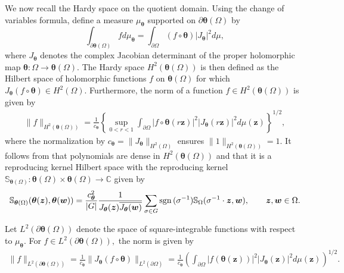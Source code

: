 \documentclass[12pt,reqno]{amsart}
\theoremstyle{remark}
\theoremstyle{definition}
\newcommand{\beq}{\begin{eqnarray}}
\newcommand{\eeq}{\end{eqnarray}}
\newcommand{\sgn}{{\rm sgn\,}}
\def \z{\boldsymbol{z}}
\begin{document}
We now recall the Hardy space on the quotient domain. Using the change of variables formula, define a measure $\mu_{\boldsymbol\theta}$ supported on $\partial \boldsymbol \theta(\Omega) $ by
$$\int_{\partial\boldsymbol{\theta} (\Omega)} f d\mu_{\boldsymbol\theta}= \int_{\partial\Omega} (f\circ \boldsymbol\theta) |J_{\boldsymbol \theta}|^2 d\mu,$$ 
where $J_{\boldsymbol\theta}$ denotes the complex Jacobian determinant of the proper holomorphic map $\boldsymbol\theta: \Omega \to \boldsymbol \theta (\Omega).$ The Hardy space $H^2(\boldsymbol \theta(\Omega))$  is then defined as the Hilbert space of holomorphic functions $f$ on $\boldsymbol \theta(\Omega)$ for which $J_{\boldsymbol \theta} (f\circ \boldsymbol \theta)\in H^2(\Omega)$. Furthermore, the norm of a function $f\in H^2(\boldsymbol \theta(\Omega))$ is given by 
\beq \label{eq 4} \|f\|_{H^2(\boldsymbol \theta(\Omega))}=\frac{1}{c_{\boldsymbol \theta}} \left\{\sup_{0<r<1} \int_{\partial\Omega}|f\circ \boldsymbol\theta(r\z)|^2 |J_{\boldsymbol\theta}(r\z)|^2 d\mu(\z) \right\}^{1/2},\eeq where the normalization by $c_{\boldsymbol \theta}=\|J_{\boldsymbol\theta}\|_{H^2(\Omega)}$ ensures $\|1\|_{H^2(\boldsymbol \theta(\Omega))}=1.$
It follows from \cite[Proposition 3.13]{GR2024} that polynomials are dense in $H^2(\boldsymbol \theta(\Omega))$ and that it is a reproducing kernel Hilbert space with the reproducing kernel $\mathbb S_{\boldsymbol \theta(\Omega)}:\boldsymbol \theta(\Omega) \times \boldsymbol \theta(\Omega) \to \mathbb C$ given by 
\beq \label{Hardy kernel} \mathbb S_{\boldsymbol \theta(\Omega)}(\boldsymbol \theta(\z), \boldsymbol\theta(\boldsymbol w))=\frac{c_{\boldsymbol \theta}^2}{|G|}\frac{1}{J_{\boldsymbol \theta}(\z)\overline{J_{\boldsymbol \theta}(\boldsymbol w)}}  \sum_{\sigma\in G} \sgn(\sigma^{-1}) \mathbb S_{\Omega}(\sigma^{-1}\cdot \z, \boldsymbol w),\qquad \z, \boldsymbol w\in \Omega.\eeq

Let $L^2(\partial\boldsymbol \theta(\Omega))$ denote the space of square-integrable functions with respect to $\mu_{\boldsymbol\theta}.$ For $f\in L^2(\partial\boldsymbol \theta(\Omega)),$ the norm is given by 
\beq \label{eq 5} \|f\|_{L^2(\partial\boldsymbol \theta(\Omega))}= \frac{1}{c_{\boldsymbol \theta}} \|J_{\boldsymbol \theta} (f\circ \boldsymbol \theta)\|_{L^2(\partial \Omega)}= \frac{1}{c_{\boldsymbol \theta}}\left( \int_{\partial\Omega} |f(\boldsymbol \theta(\z))|^2 |J_{\boldsymbol \theta}(\z)|^2 d\mu(\z)\right)^{1/2}.\eeq
\end{document}
